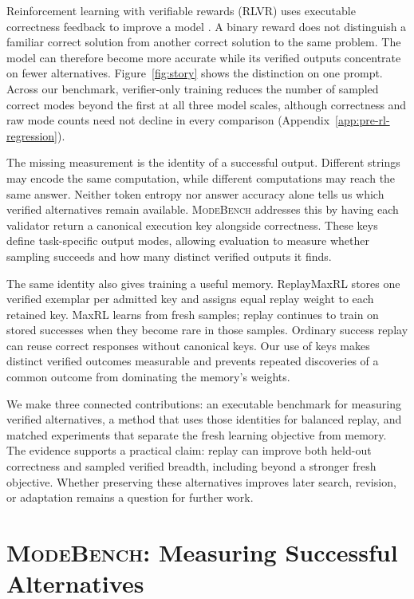 \documentclass{article}
\newcommand{\1}{\mathbf 1}
\newcommand{\mb}{\textsc{ModeBench}}
\theoremstyle{remark}
\theoremstyle{definition}
\theoremstyle{plain}
\begin{document}
Reinforcement learning with verifiable rewards (RLVR) uses executable
correctness feedback to improve a model \citep{guo2025deepseekr1}. A binary reward
does not distinguish a familiar correct solution from another correct solution
to the same problem. The model can therefore become more accurate while its
verified outputs concentrate on fewer alternatives. Figure~\ref{fig:story}
shows the distinction on one prompt. Across our benchmark, verifier-only
training reduces the number of sampled correct modes beyond the first at all
three model scales, although correctness and raw mode counts need not decline
in every comparison (Appendix~\ref{app:pre-rl-regression}).

The missing measurement is the identity of a successful output. Different
strings may encode the same computation, while different computations may
reach the same answer. Neither token entropy nor answer accuracy alone tells
us which verified alternatives remain available. \mb{} addresses this by
having each validator return a canonical execution key alongside correctness.
These keys define task-specific output modes, allowing evaluation to measure whether sampling succeeds and how many
distinct verified outputs it finds.

The same identity also gives training a useful memory. ReplayMaxRL stores one
verified exemplar per admitted key and assigns equal replay weight to each
retained key. MaxRL learns from fresh samples; replay continues to train on
stored successes when they become rare in those samples. Ordinary success
replay can reuse correct responses without canonical keys. Our use of keys
makes distinct verified outcomes measurable and prevents repeated discoveries
of a common outcome from dominating the memory's weights.

We make three connected contributions: an executable benchmark for measuring
verified alternatives, a method that uses those identities for balanced replay,
and matched experiments that separate the fresh learning objective from memory.
The evidence supports a practical claim: replay can improve both held-out
correctness and sampled verified breadth, including beyond a stronger fresh
objective. Whether preserving these alternatives improves later search, revision, or
adaptation remains a question for further work.

\section{\mb: Measuring Successful Alternatives}
\label{sec:modebench}
\label{sec:collapse}
\end{document}
